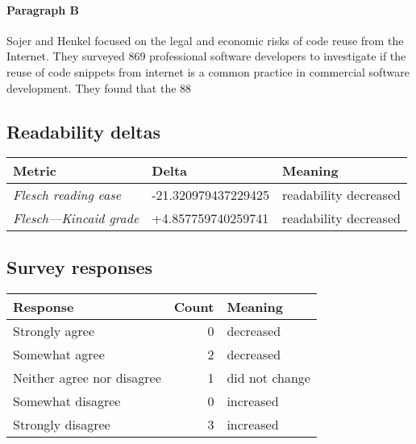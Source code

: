 \paragraph{Paragraph B}
Sojer and Henkel focused on the legal and economic risks of code reuse from the Internet. They surveyed 869 professional software developers to investigate if the reuse of code snippets from internet is a common practice in commercial software development. They found that the 88%

\subsection{Readability deltas}

\begin{tabular}{lll}
\toprule
               \textbf{Metric} &       \textbf{Delta} &       \textbf{Meaning} \\
\midrule
    \emph{Flesch reading ease} &  -21.320979437229425 &  readability decreased \\
 \emph{Flesch---Kincaid grade} &   +4.857759740259741 &  readability decreased \\
\bottomrule
\end{tabular}

\subsection{Survey responses}
\begin{tabular}{lrl}
\toprule
          \textbf{Response} &  \textbf{Count} & \textbf{Meaning} \\
\midrule
             Strongly agree &               0 &        decreased \\
             Somewhat agree &               2 &        decreased \\
 Neither agree nor disagree &               1 &   did not change \\
          Somewhat disagree &               0 &        increased \\
          Strongly disagree &               3 &        increased \\
\bottomrule
\end{tabular}

